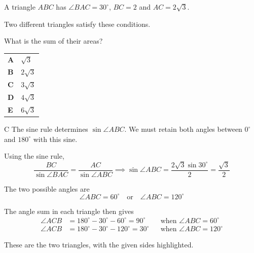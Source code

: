\documentclass[11pt,a4paper]{article}
\begin{document}
\thispagestyle{djssolutions}
\djsFrontMatter
\clearpage
\thispagestyle{djssolutions}
\vspace*{8pt}
\begin{enumerate}[label=\textbf{\arabic*.},leftmargin=*,itemsep=0pt,start=1]
\questionitem[Trigonometry]
A triangle $ABC$ has $\angle BAC=30^\circ$, $BC=2$ and $AC=2\sqrt{3}$. 

Two different triangles satisfy these conditions. 

What is the sum of their areas?

\par\vspace*{12pt}
\begin{tabularx}{\linewidth}{@{}>{\bfseries}l Y@{}}
A &
$\sqrt{3}$
\\[0.8em]
B &
$2\sqrt{3}$
\\[0.8em]
C &
$3\sqrt{3}$
\\[0.8em]
D &
$4\sqrt{3}$
\\[0.8em]
E &
$6\sqrt{3}$
\\
\end{tabularx}

\begin{djsSolution}{C}
The sine rule determines $\sin\angle ABC$. We must retain both angles between $0^\circ$ and $180^\circ$ with this sine.

Using the sine rule,
\[
\frac{BC}{\sin\angle BAC}=\frac{AC}{\sin\angle ABC}
\implies \sin\angle ABC=\frac{2\sqrt3\sin30^\circ}{2}=\frac{\sqrt3}{2}
\]

The two possible angles are
\[
\angle ABC=60^\circ\quad\text{or}\quad\angle ABC=120^\circ
\]

The angle sum in each triangle then gives
\[
\begin{aligned}
\angle ACB&=180^\circ-30^\circ-60^\circ=90^\circ &&\text{when }\angle ABC=60^\circ\\[5pt]
\angle ACB&=180^\circ-30^\circ-120^\circ=30^\circ &&\text{when }\angle ABC=120^\circ
\end{aligned}
\]

These are the two triangles, with the given sides highlighted.

\begin{djsSolutionFigure}
\end{djsSolutionFigure}
\end{djsSolution}
\end{enumerate}
\end{document}
